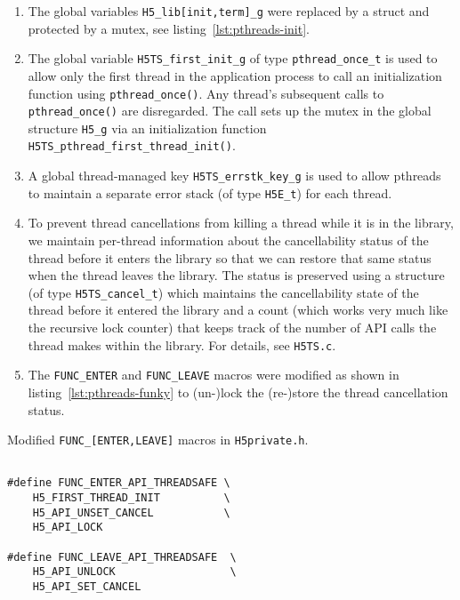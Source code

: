 \begin{enumerate}
    \item The global variables \texttt{H5\_lib[init,term]\_g} were replaced by a struct and protected by a mutex, see listing~\ref{lst:pthreads-init}.
    \item The global variable \texttt{H5TS\_first\_init\_g} of type \texttt{pthread\_once\_t} is used to allow only the first thread in the application process to call an initialization function using \texttt{pthread\_once()}. Any thread's subsequent calls to \texttt{pthread\_once()} are disregarded. The call sets up the mutex in the global structure \texttt{H5\_g} via an initialization function \texttt{H5TS\_pthread\_first\_thread\_init()}.
    \item A global thread-managed key \texttt{H5TS\_errstk\_key\_g} is used to allow pthreads to maintain a separate error stack (of type \texttt{H5E\_t}) for each thread.
    \item To prevent thread cancellations from killing a thread while it is in the library, we maintain per-thread information about the cancellability status of the thread before it enters the library so that we can restore that same status when the thread leaves the library. The status is preserved using a structure (of type \texttt{H5TS\_cancel\_t}) which maintains the cancellability state of the thread before it entered the library and a count (which works very much like the recursive lock counter) that keeps track of the number of API calls the thread makes within the library. For details, see \texttt{H5TS.c}.
    \item The \texttt{FUNC\_ENTER} and \texttt{FUNC\_LEAVE} macros were modified as shown in listing~\ref{lst:pthreads-funky} to (un-)lock the (re-)store the thread cancellation status.
\end{enumerate}


\begin{listing}
\centering
\caption{Modified \texttt{FUNC\_[ENTER,LEAVE]} macros in \texttt{H5private.h}.}
\label{lst:pthreads-funky}
\begin{verbatim}

#define FUNC_ENTER_API_THREADSAFE \                            
    H5_FIRST_THREAD_INIT          \
    H5_API_UNSET_CANCEL           \
    H5_API_LOCK

#define FUNC_LEAVE_API_THREADSAFE  \
    H5_API_UNLOCK                  \
    H5_API_SET_CANCEL

\end{verbatim}
\end{listing}

